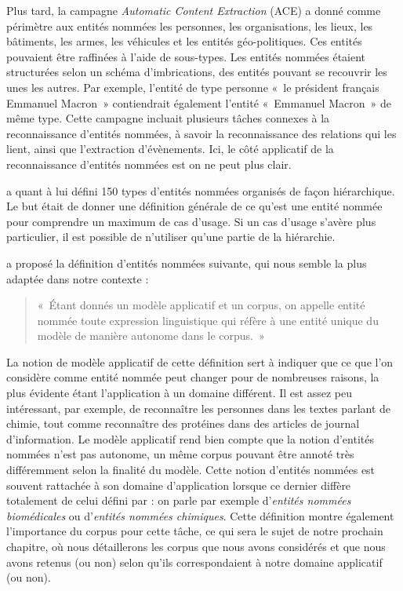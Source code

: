 \documentclass[12pt,a4paper,times,twoside,openright]{report}
\begin{document}
Plus tard, la campagne \textit{Automatic Content Extraction} (ACE) \citep{doddington2004automatic} a donné comme périmètre aux entités nommées les personnes, les organisations, les lieux, les bâtiments, les armes, les véhicules et les entités géo-politiques. Ces entités pouvaient être raffinées à l'aide de sous-types. Les entités nommées étaient structurées selon un schéma d'imbrications, des entités pouvant se recouvrir les unes les autres. Par exemple, l'entité de type personne «\ le président français Emmanuel Macron\ » contiendrait également l'entité «\ Emmanuel Macron\ » de même type. Cette campagne incluait plusieurs tâches connexes à la reconnaissance d'entités nommées, à savoir la reconnaissance des relations qui les lient, ainsi que l'extraction d'évènements. Ici, le côté applicatif de la reconnaissance d'entités nommées est on ne peut plus clair.

\citet{sekine2004} a quant à lui défini 150 types d'entités nommées organisés de façon hiérarchique. Le but était de donner une définition générale de ce qu'est une entité nommée pour comprendre un maximum de cas d'usage. Si un cas d'usage s'avère plus particulier, il est possible de n'utiliser qu'une partie de la hiérarchie.

\citet{ehrmann2008entites} a proposé la définition d'entités nommées suivante, qui nous semble la plus adaptée dans notre contexte : \begin{quote}«\ Étant donnés un modèle applicatif et un corpus, on appelle entité nommée toute expression linguistique qui réfère à une entité unique du modèle de manière autonome dans le corpus.\ »\end{quote}

La notion de modèle applicatif de cette définition sert à indiquer que ce que l'on considère comme entité nommée peut changer pour de nombreuses raisons, la plus évidente étant l'application à un domaine différent. Il est assez peu intéressant, par exemple, de reconnaître les personnes dans les textes parlant de chimie, tout comme reconnaître des protéines dans des articles de journal d'information. Le modèle applicatif rend bien compte que la notion d'entités nommées n'est pas autonome, un même corpus pouvant être annoté très différemment selon la finalité du modèle. Cette notion d'entités nommées est souvent rattachée à son domaine d'application lorsque ce dernier diffère totalement de celui défini par \citet{grishman1996message} : on parle par exemple d'\emph{entités nommées biomédicales} ou d'\emph{entités nommées chimiques}. Cette définition montre également l'importance du corpus pour cette tâche, ce qui sera le sujet de notre prochain chapitre, où nous détaillerons les corpus que nous avons considérés et que nous avons retenus (ou non) selon qu'ils correspondaient à notre domaine applicatif (ou non).
\end{document}
